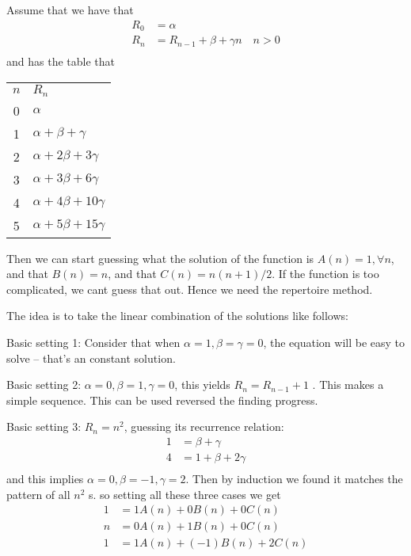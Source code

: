 
Assume that we have that 
\begin{align*}
    R_0 &= \alpha \\
    R_n &= R_{n-1}+\beta+\gamma n \quad n>0 \\
\end{align*}
and has the table that 
\begin{tabular}{c|l}
    $n$ & $R_n$ \\
    0 & $\alpha$ \\
    1 & $\alpha + \beta + \gamma$ \\
    2 & $\alpha + 2\beta + 3\gamma$ \\
    3 & $\alpha + 3\beta + 6\gamma$ \\
    4 & $\alpha + 4\beta + 10\gamma$ \\
    5 & $\alpha + 5\beta + 15\gamma$ \\
\end{tabular}

Then we can start guessing what the solution of the function is
$A(n)=1, \forall n$, and that $B(n)=n$, and that $C(n)=n(n+1)/2$. 
If the function is too complicated, we cant guess that out. 
Hence we need the repertoire method. 

The idea is to take the linear combination of the solutions like 
follows: 

Basic setting 1: Consider that when $\alpha=1,\beta=\gamma=0$, the equation will be 
easy to solve -- that's an constant solution. 

Basic setting 2: $\alpha=0,\beta=1,\gamma=0$, this yields $R_n = R_{n-1}+1$
. This makes a simple sequence. This can be used reversed the finding 
progress. 

Basic setting 3: $R_n=n^2$, guessing its recurrence relation: 
\begin{align*}
    1&=\beta+\gamma\\
    4 &= 1+\beta+2\gamma \\
\end{align*}
and this implies $\alpha=0,\beta=-1,\gamma=2$. Then by induction
we found it matches the pattern of all $n^2$ s. 
so setting all these three cases we get 
\begin{align*}
    1 &= 1A(n) + 0B (n)+ 0C(n) \\
    n &= 0A(n) + 1B (n)+ 0C(n) \\
    1 &= 1A(n) + (-1)B (n)+ 2C(n) \\
\end{align*}


